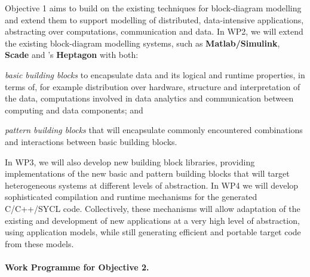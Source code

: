\documentclass[a4paper,11pt]{article}
\begin{document}
Objective 1 aims to build on the existing techniques for block-diagram modelling and extend them to support
modelling of distributed, data-intensive applications, abstracting over computations, communication and
data. In WP2, we will extend the existing block-diagram modelling systems, such as 
\textbf{Matlab/Simulink}, \textbf{Scade} and \INRIAshort{}'s \textbf{Heptagon}  with both:
\begin{inparaenum}[i)]
\item
\emph{basic building blocks} to encapsulate data and its logical and runtime properties, in terms of, for example
distribution over hardware, structure and interpretation of the data, computations involved in data
analytics and communication between computing and data components;
 and
\item
\emph{pattern building blocks} that will encapsulate commonly encountered combinations and interactions between basic building blocks.
\end{inparaenum}
In WP3, we will also develop new building block
libraries, providing implementations of the new basic and pattern building blocks that will target
heterogeneous systems at different levels of abstraction. In WP4 we will develop sophisticated 
compilation and runtime mechanisms for the generated C/C++/SYCL code. %
Collectively, these mechanisms will allow adaptation of the existing and development of new applications at
a very high level of abstraction, using application models, while still generating efficient 
and portable target 
code from these models. %

\paragraph*{Work Programme for Objective 2.}
\end{document}
